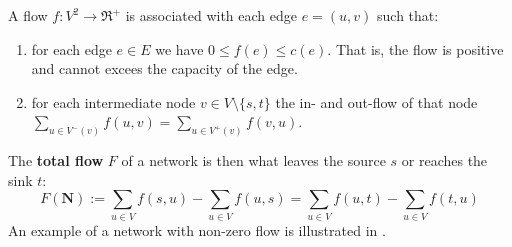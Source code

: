 \begin{definition}[Flow]
	A flow $f : V^2 \longrightarrow \Re^{+}$ is associated with each edge $e = (u,v)$ such that:
	\begin{enumerate}
		\item for each edge $e \in E$ we have $0 \leq f(e) \leq c(e)$. That is, the flow is positive and cannot excees the capacity of the edge.
		
		\item for each intermediate node $v \in V\setminus \{s,t\}$ the in- and out-flow of that node $\sum_{u \in V^-(v)} f(u,v) = \sum_{u \in V^+(v)} f(v,u)$.
	\end{enumerate}
	The \textbf{total flow} $F$ of a network is then what leaves the source $s$ or reaches the sink $t$:
	\begin{equation}
	F(\textbf{N}) := \sum_{u \in V} f(s,u) - \sum_{u \in V}f(u,s) = \sum_{u \in V} f(u,t) - \sum_{u \in V}f(t,u)
	\end{equation}
	An example of a network with non-zero flow is illustrated in .
\end{definition}

